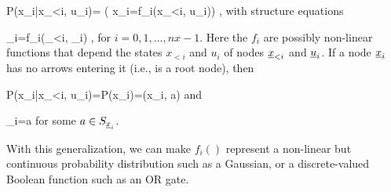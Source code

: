 \beq\color{blue}
P(x_i|x_{<i}, u_i)=
\indi(
x_i=f_i(x_{<i}, u_i))
\;,
\label{eq-nonlinear-pa-tpm}
\eeq
with structure equations

\beq
\rvx_i=f_i(\rvx_{<i}, \rvu_i)
\;,
\label{eq-pa-nonlinear-struc}
\eeq
for $i=0, 1, \ldots, nx-1$.
Here the $f_i$ are 
possibly non-linear
functions
that depend
the states
$x_{<i}$ and $u_i$
of nodes ${\underline{x}}_{<i}$
and ${\underline{u}}_i$.
If a node ${\underline{x}}_i$
has no arrows
entering it (i.e., is
a root node), then

\beq\color{blue}
P(x_i|x_{<i}, u_i)=P(x_i)=\delta(x_i, a)
\eeq
and

\beq
\rvx_i=a
\eeq
for some $a\in S_{{\underline{x}}_i}$.


With this generalization,
we can make
$f_i()$
represent a
non-linear
but continuous probability
distribution
such as a Gaussian,
or a discrete-valued Boolean
function
such as an OR gate.




